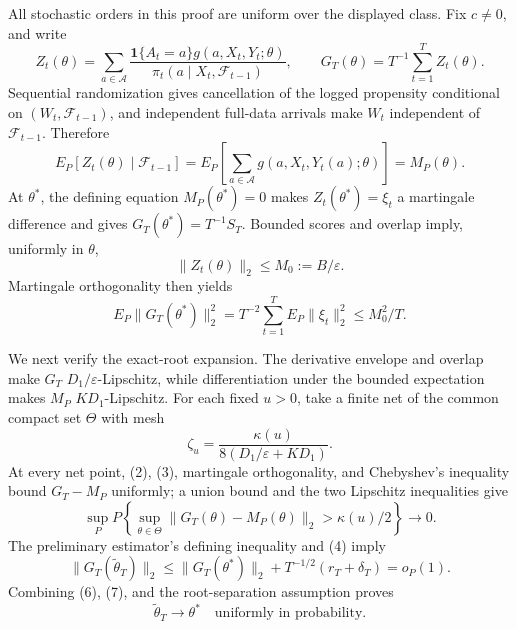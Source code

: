 All stochastic orders in this proof are uniform over the displayed class. Fix \(c\ne0\), and write
\[
 Z_t(\theta)=\sum_{a\in\mathcal A}
 \frac{\mathbf1\{A_t=a\}g(a,X_t,Y_t;\theta)}
 {\pi_t(a\mid X_t,\mathcal F_{t-1})},
 \qquad G_T(\theta)=T^{-1}\sum_{t=1}^TZ_t(\theta).
\tag{1}
\]
Sequential randomization gives cancellation of the logged propensity conditional on \((W_t,\mathcal F_{t-1})\), and independent full-data arrivals make \(W_t\) independent of \(\mathcal F_{t-1}\). Therefore
\[
 E_P[Z_t(\theta)\mid\mathcal F_{t-1}]
 =E_P\!\left[\sum_{a\in\mathcal A}g(a,X_t,Y_t(a);\theta)\right]
 =M_P(\theta).
\tag{2}
\]
At \(\theta^*\), the defining equation \(M_P(\theta^*)=0\) makes \(Z_t(\theta^*)=\xi_t\) a martingale difference and gives \(G_T(\theta^*)=T^{-1}S_T\). Bounded scores and overlap imply, uniformly in \(\theta\),
\[
 \|Z_t(\theta)\|_2\le M_0:=B/\varepsilon.
\tag{3}
\]
Martingale orthogonality then yields
\[
 E_P\|G_T(\theta^*)\|_2^2
 =T^{-2}\sum_{t=1}^TE_P\|\xi_t\|_2^2
 \le M_0^2/T.
\tag{4}
\]

We next verify the exact-root expansion. The derivative envelope and overlap make \(G_T\) \(D_1/\varepsilon\)-Lipschitz, while differentiation under the bounded expectation makes \(M_P\) \(KD_1\)-Lipschitz. For each fixed \(u>0\), take a finite net of the common compact set \(\Theta\) with mesh
\[
 \zeta_u=\frac{\kappa(u)}{8(D_1/\varepsilon+KD_1)}.
\tag{5}
\]
At every net point, (2), (3), martingale orthogonality, and Chebyshev's inequality bound \(G_T-M_P\) uniformly; a union bound and the two Lipschitz inequalities give
\[
 \sup_P P\!\left\{\sup_{\theta\in\Theta}
 \|G_T(\theta)-M_P(\theta)\|_2>\kappa(u)/2\right\}\longrightarrow0.
\tag{6}
\]
The preliminary estimator's defining inequality and (4) imply
\[
 \|G_T(\widetilde\theta_T)\|_2
 \le\|G_T(\theta^*)\|_2+T^{-1/2}(r_T+\delta_T)=o_P(1).
\tag{7}
\]
Combining (6), (7), and the root-separation assumption proves
\[
 \widetilde\theta_T\longrightarrow\theta^*
 \quad\text{uniformly in probability}.
\tag{8}
\]

